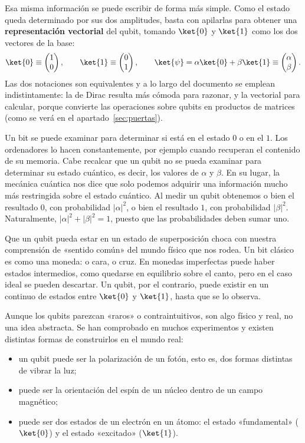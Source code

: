 Esa misma información se puede escribir de forma más simple. Como el estado queda determinado
por sus dos amplitudes, basta con apilarlas para obtener una \textbf{representación
vectorial} del qubit, tomando $\ket{0}$ y $\ket{1}$ como los dos vectores de la base:
\begin{equation}
\label{eq:vector_estado}
\ket{0} \equiv \begin{pmatrix} 1 \\ 0 \end{pmatrix},
\qquad
\ket{1} \equiv \begin{pmatrix} 0 \\ 1 \end{pmatrix},
\qquad
\ket{\psi} = \alpha\ket{0} + \beta\ket{1} \equiv
\begin{pmatrix} \alpha \\ \beta \end{pmatrix}.
\end{equation}
Las dos notaciones son equivalentes y a lo largo del documento se emplean indistintamente:
la de Dirac resulta más cómoda para razonar, y la vectorial para calcular, porque convierte
las operaciones sobre qubits en productos de matrices (como se verá en el
apartado~\ref{sec:puertas}).

Un bit se puede examinar para determinar si está en el estado $0$ o en el $1$. Los ordenadores
lo hacen constantemente, por ejemplo cuando recuperan el contenido de su memoria. Cabe recalcar
que un qubit no se pueda examinar para determinar su estado cuántico, es decir, los
valores de $\alpha$ y $\beta$. En su lugar, la mecánica cuántica nos dice que solo podemos
adquirir una información mucho más restringida sobre el estado cuántico. Al medir un qubit
obtenemos o bien el resultado $0$, con probabilidad $|\alpha|^2$, o bien el resultado $1$, con
probabilidad $|\beta|^2$. Naturalmente, $|\alpha|^2 + |\beta|^2 = 1$, puesto que las
probabilidades deben sumar uno.

Que un qubit pueda estar en un estado de superposición choca con nuestra comprensión de
«sentido común» del mundo físico que nos rodea. Un bit clásico es como una moneda: o cara,
o cruz. En monedas imperfectas puede haber estados intermedios, como quedarse en equilibrio
sobre el canto, pero en el caso ideal se pueden descartar. Un qubit, por el contrario, puede
existir en un continuo de estados entre $\ket{0}$ y $\ket{1}$, hasta que se lo observa.

Aunque los qubits parezcan «raros» o contraintuitivos, son algo físico y real, no una idea
abstracta. Se han comprobado en muchos experimentos y existen distintas formas de
construirlos en el mundo real:
\begin{itemize}
    \item un qubit puede ser la polarización de un fotón, esto es, dos formas distintas de
          vibrar la luz;
    \item puede ser la orientación del espín de un núcleo dentro de un campo magnético;
    \item puede ser dos estados de un electrón en un átomo: el estado «fundamental»
          ($\ket{0}$) y el estado «excitado» ($\ket{1}$).
\end{itemize}

